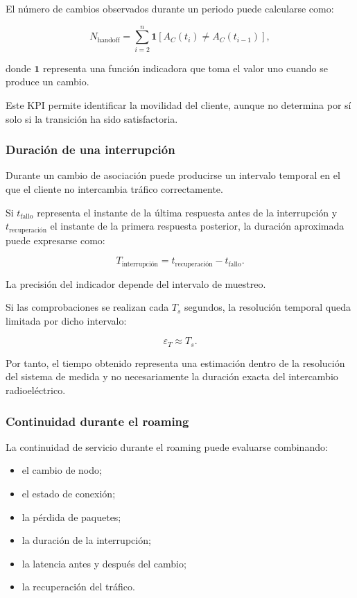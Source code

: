 El número de cambios observados durante un periodo puede calcularse como:

\[
    N_{\mathrm{handoff}}
    =
    \sum_{i=2}^{n}
    \mathbf{1}
    \left[
        A_C(t_i)
        \neq
        A_C(t_{i-1})
    \right],
\]

donde \(\mathbf{1}\) representa una función indicadora que toma el valor
uno cuando se produce un cambio.

Este KPI permite identificar la movilidad del cliente, aunque no
determina por sí solo si la transición ha sido satisfactoria.


\subsubsection*{Duración de una interrupción}

Durante un cambio de asociación puede producirse un intervalo temporal en
el que el cliente no intercambia tráfico correctamente.

Si \(t_{\mathrm{fallo}}\) representa el instante de la última respuesta
antes de la interrupción y \(t_{\mathrm{recuperación}}\) el instante de
la primera respuesta posterior, la duración aproximada puede expresarse
como:

\[
    T_{\mathrm{interrupción}}
    =
    t_{\mathrm{recuperación}}
    -
    t_{\mathrm{fallo}}.
\]

La precisión del indicador depende del intervalo de muestreo.

Si las comprobaciones se realizan cada \(T_s\) segundos, la resolución
temporal queda limitada por dicho intervalo:

\[
    \varepsilon_T
    \approx
    T_s.
\]

Por tanto, el tiempo obtenido representa una estimación dentro de la
resolución del sistema de medida y no necesariamente la duración exacta
del intercambio radioeléctrico.


\subsubsection*{Continuidad durante el roaming}

La continuidad de servicio durante el roaming puede evaluarse combinando:

\begin{itemize}
    \item el cambio de nodo;

    \item el estado de conexión;

    \item la pérdida de paquetes;

    \item la duración de la interrupción;

    \item la latencia antes y después del cambio;

    \item la recuperación del tráfico.
\end{itemize}

